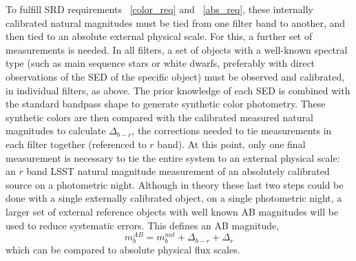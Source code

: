 \documentclass[12pt,preprint]{aastex}
\begin{document}
To fulfill SRD requirements ~\ref{color_req} and ~\ref{abs_req}, these
internally calibrated natural magnitudes must be tied from one filter
band to another, and then tied to an absolute external physical scale.
For this, a further set of measurements is needed. In all filters, a
set of objects with a well-known spectral type (such as main sequence
stars or white dwarfs, preferably with direct observations of the SED
of the specific object) must be observed and calibrated, in individual
filters, as above. The prior knowledge of each SED is combined with
the standard bandpass shape to generate synthetic color
photometry. These synthetic colors are then compared with the
calibrated measured natural magnitudes to calculate $\Delta_{b-r}$,
the corrections needed to tie measurements in each filter together
(referenced to $r$ band).  At this point, only one final measurement
is necessary to tie the entire system to an external physical scale:
an $r$ band LSST natural magnitude measurement of an absolutely
calibrated source on a photometric night. Although in theory these
last two steps could be done with a single externally calibrated
object, on a single photometric night, a larger set of external
reference objects with well known AB magnitudes will be used to reduce
systematic errors. This defines an AB magnitude,
\begin{equation}
\label{eqn:extmags}
m_b^{AB} = m_b^{nat}  + \Delta_{b-r} + \Delta_r
\end{equation}
which can be compared to absolute physical flux scales. 
\end{document}
